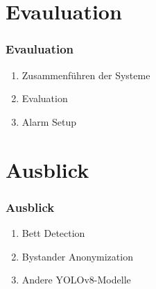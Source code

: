 \documentclass[]{beamer}
\begin{document}
\section{Evauluation}
\begin{frame}
	\frametitle{Evauluation}
	\begin{enumerate}
		\item Zusammenführen der Systeme
		\item Evaluation
		\item Alarm Setup
	\end{enumerate}
\end{frame}

\section{Ausblick}
\begin{frame}
	\frametitle{Ausblick}
	\begin{enumerate}
		\item Bett Detection
		\item Bystander Anonymization
		\item Andere YOLOv8-Modelle 
	\end{enumerate}
\end{frame}
\end{document}
